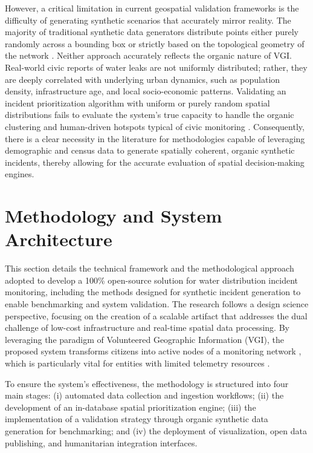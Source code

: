 \documentclass[conference]{IEEEtran}
\begin{document}
However, a critical limitation in current geospatial validation frameworks is the difficulty of generating synthetic scenarios that accurately mirror reality. The majority of traditional synthetic data generators distribute points either purely randomly across a bounding box or strictly based on the topological geometry of the network \cite{mcalinden2024}. Neither approach accurately reflects the organic nature of VGI. Real-world civic reports of water leaks are not uniformly distributed; rather, they are deeply correlated with underlying urban dynamics, such as population density, infrastructure age, and local socio-economic patterns. Validating an incident prioritization algorithm with uniform or purely random spatial distributions fails to evaluate the system's true capacity to handle the organic clustering and human-driven hotspots typical of civic monitoring \cite{sun2024}. Consequently, there is a clear necessity in the literature for methodologies capable of leveraging demographic and census data to generate spatially coherent, organic synthetic incidents, thereby allowing for the accurate evaluation of spatial decision-making engines.

\section{Methodology and System Architecture}
\label{methodology_and_system_architecture}

This section details the technical framework and the methodological approach adopted to develop a 100\% open-source solution for water distribution incident monitoring, including the methods designed for synthetic incident generation to enable benchmarking and system validation. The research follows a design science perspective, focusing on the creation of a scalable artifact that addresses the dual challenge of low-cost infrastructure and real-time spatial data processing. By leveraging the paradigm of Volunteered Geographic Information (VGI), the proposed system transforms citizens into active nodes of a monitoring network \cite{goodchild2007}, which is particularly vital for entities with limited telemetry resources \cite{mcdonald2025}. 

To ensure the system's effectiveness, the methodology is structured into four main stages: (i) automated data collection and ingestion workflows; (ii) the development of an in-database spatial prioritization engine; (iii) the implementation of a validation strategy through organic synthetic data generation for benchmarking; and (iv) the deployment of visualization, open data publishing, and humanitarian integration interfaces.
\end{document}

